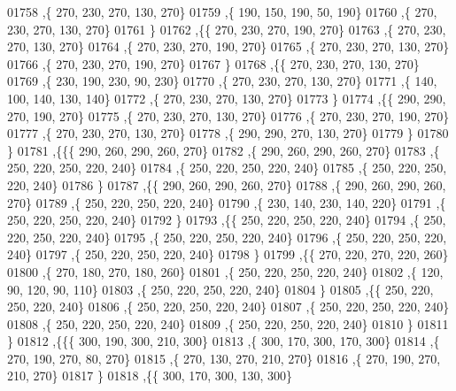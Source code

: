 \begin{DoxyCode}
01758     ,\{   270,   230,   270,   130,   270\}
01759     ,\{   190,   150,   190,    50,   190\}
01760     ,\{   270,   230,   270,   130,   270\}
01761     \}
01762    ,\{\{   270,   230,   270,   190,   270\}
01763     ,\{   270,   230,   270,   130,   270\}
01764     ,\{   270,   230,   270,   190,   270\}
01765     ,\{   270,   230,   270,   130,   270\}
01766     ,\{   270,   230,   270,   190,   270\}
01767     \}
01768    ,\{\{   270,   230,   270,   130,   270\}
01769     ,\{   230,   190,   230,    90,   230\}
01770     ,\{   270,   230,   270,   130,   270\}
01771     ,\{   140,   100,   140,   130,   140\}
01772     ,\{   270,   230,   270,   130,   270\}
01773     \}
01774    ,\{\{   290,   290,   270,   190,   270\}
01775     ,\{   270,   230,   270,   130,   270\}
01776     ,\{   270,   230,   270,   190,   270\}
01777     ,\{   270,   230,   270,   130,   270\}
01778     ,\{   290,   290,   270,   130,   270\}
01779     \}
01780    \}
01781   ,\{\{\{   290,   260,   290,   260,   270\}
01782     ,\{   290,   260,   290,   260,   270\}
01783     ,\{   250,   220,   250,   220,   240\}
01784     ,\{   250,   220,   250,   220,   240\}
01785     ,\{   250,   220,   250,   220,   240\}
01786     \}
01787    ,\{\{   290,   260,   290,   260,   270\}
01788     ,\{   290,   260,   290,   260,   270\}
01789     ,\{   250,   220,   250,   220,   240\}
01790     ,\{   230,   140,   230,   140,   220\}
01791     ,\{   250,   220,   250,   220,   240\}
01792     \}
01793    ,\{\{   250,   220,   250,   220,   240\}
01794     ,\{   250,   220,   250,   220,   240\}
01795     ,\{   250,   220,   250,   220,   240\}
01796     ,\{   250,   220,   250,   220,   240\}
01797     ,\{   250,   220,   250,   220,   240\}
01798     \}
01799    ,\{\{   270,   220,   270,   220,   260\}
01800     ,\{   270,   180,   270,   180,   260\}
01801     ,\{   250,   220,   250,   220,   240\}
01802     ,\{   120,    90,   120,    90,   110\}
01803     ,\{   250,   220,   250,   220,   240\}
01804     \}
01805    ,\{\{   250,   220,   250,   220,   240\}
01806     ,\{   250,   220,   250,   220,   240\}
01807     ,\{   250,   220,   250,   220,   240\}
01808     ,\{   250,   220,   250,   220,   240\}
01809     ,\{   250,   220,   250,   220,   240\}
01810     \}
01811    \}
01812   ,\{\{\{   300,   190,   300,   210,   300\}
01813     ,\{   300,   170,   300,   170,   300\}
01814     ,\{   270,   190,   270,    80,   270\}
01815     ,\{   270,   130,   270,   210,   270\}
01816     ,\{   270,   190,   270,   210,   270\}
01817     \}
01818    ,\{\{   300,   170,   300,   130,   300\}

\end{DoxyCode}
